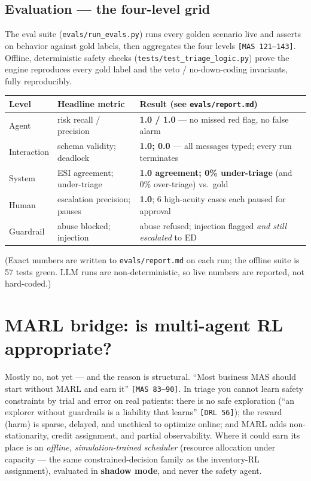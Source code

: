 \documentclass[11pt]{article}
\newcommand{\code}[1]{\texttt{#1}}
\begin{document}
\subsection{Evaluation --- the four-level grid}
The eval suite (\code{evals/run\_evals.py}) runs every golden scenario live and asserts on
behavior against gold labels, then aggregates the four levels \code{[MAS 121--143]}. Offline,
deterministic safety checks (\code{tests/test\_triage\_logic.py}) prove the engine reproduces
every gold label and the veto / no-down-coding invariants, fully reproducibly.

\begin{center}\small
\begin{tabular}{@{}llp{8.2cm}@{}}
\toprule
\textbf{Level} & \textbf{Headline metric} & \textbf{Result (see \code{evals/report.md})} \\
\midrule
Agent & risk recall / precision & \textbf{1.0 / 1.0} --- no missed red flag, no false alarm \\
Interaction & schema validity; deadlock & \textbf{1.0; 0.0} --- all messages typed; every run terminates \\
System & ESI agreement; under-triage & \textbf{1.0 agreement; 0\% under-triage} (and 0\% over-triage) vs.\ gold \\
Human & escalation precision; pauses & \textbf{1.0}; 6 high-acuity cases each paused for approval \\
Guardrail & abuse blocked; injection & abuse refused; injection flagged \emph{and still escalated} to ED \\
\bottomrule
\end{tabular}
\end{center}
\noindent (Exact numbers are written to \code{evals/report.md} on each run; the offline suite is
57 tests green. LLM runs are non-deterministic, so live numbers are reported, not hard-coded.)

\section{MARL bridge: is multi-agent RL appropriate?}
Mostly no, not yet --- and the reason is structural. ``Most business MAS should start without
MARL and earn it'' \code{[MAS 83--90]}. In triage you cannot learn safety constraints by trial
and error on real patients: there is no safe exploration (``an explorer without guardrails is a
liability that learns'' \code{[DRL 56]}); the reward (harm) is sparse, delayed, and unethical to
optimize online; and MARL adds non-stationarity, credit assignment, and partial observability.
Where it could earn its place is an \emph{offline, simulation-trained scheduler} (resource
allocation under capacity --- the same constrained-decision family as the inventory-RL
assignment), evaluated in \textbf{shadow mode}, and never the safety agent.
\end{document}
